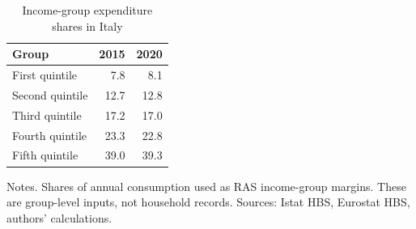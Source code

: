 \begin{table}[H]
\footnotesize
\setlength{\tabcolsep}{3.5pt}
\renewcommand{\arraystretch}{0.88}

\caption{\label{tab:it-hbs-all-products}Income-group expenditure shares in Italy}
\centering
\begin{tabular}[t]{lrr}
\toprule
Group & 2015 & 2020\\
\midrule
First quintile & 7.8 & 8.1\\
Second quintile & 12.7 & 12.8\\
Third quintile & 17.2 & 17.0\\
Fourth quintile & 23.3 & 22.8\\
Fifth quintile & 39.0 & 39.3\\
\bottomrule
\end{tabular}
\vspace{-0.6em}
\begin{flushleft}
\scriptsize{Notes. Shares of annual consumption used as RAS income-group margins. These are group-level inputs, not household records. Sources: Istat HBS, Eurostat HBS, authors' calculations.}
\end{flushleft}
\end{table}
